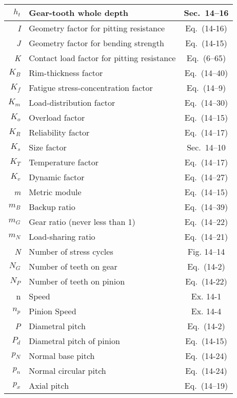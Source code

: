 \documentclass{article}
\begin{document}
\begin{center}
\begin{longtable}{| r | l | c |}
\hline
\textit{$h_t$} & Gear-tooth whole depth & Sec.~14–16 \\
\hline
\textit{I} & Geometry factor for pitting resistance & Eq.~(14-16) \\
\hline
\textit{J} & Geometry factor for bending strength & Eq.~(14-15) \\
\hline
\textit{K} & Contact load factor for pitting resistance & Eq.~(6–65) \\
\hline
\textit{$K_B$} & Rim-thickness factor & Eq.~(14–40) \\
\hline
\textit{$K_f$} & Fatigue stress-concentration factor & Eq.~(14–9) \\
\hline
\textit{$K_m$} & Load-distribution factor & Eq.~(14–30) \\
\hline
\textit{$K_o$} & Overload factor & Eq.~(14–15) \\
\hline
\textit{$K_R$} & Reliability factor & Eq.~(14–17) \\
\hline
\textit{$K_s$} & Size factor & Sec.~14–10 \\
\hline
\textit{$K_T$} & Temperature factor & Eq.~(14–17) \\
\hline
\textit{$K_v$} & Dynamic factor & Eq.~(14–27) \\
\hline
\textit{m} & Metric module & Eq.~(14–15) \\
\hline
\textit{$m_B$} & Backup ratio & Eq.~(14–39) \\
\hline
\textit{$m_G$} & Gear ratio (never less than 1) & Eq.~(14–22) \\
\hline
\textit{$m_N$} & Load-sharing ratio & Eq.~(14–21) \\
\hline
\textit{N} & Number of stress cycles & Fig. 14–14 \\
\hline
\textit{$N_G$} & Number of teeth on gear & Eq.~(14-2) \\
\hline
\textit{$N_P$} & Number of teeth on pinion & Eq.~(14-22) \\
\hline
n & Speed & Ex. 14-1 \\
\hline
\textit{$n_p$} & Pinion Speed & Ex. 14-4 \\
\hline
\textit{P} & Diametral pitch & Eq.~(14-2) \\
\hline
\textit{$P_d$} & Diametral pitch of pinion & Eq.~(14-15) \\
\hline
\textit{$p_N$} & Normal base pitch & Eq.~(14-24) \\
\hline
\textit{$p_n$} & Normal circular pitch & Eq.~(14-24) \\
\hline
\textit{$p_x$} & Axial pitch & Eq.~(14–19) \\

\end{longtable}
\end{center}
\end{document}
